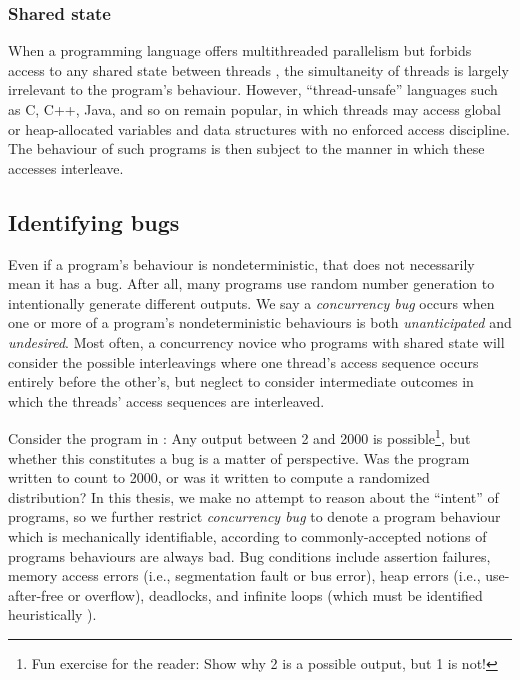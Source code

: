 \subsubsection{Shared state}
When a programming language offers multithreaded parallelism but forbids access to any shared state between threads
\cite{erlang,rust-book},
the simultaneity of threads is largely irrelevant to the program's behaviour.
However, ``thread-unsafe'' languages such as C, C++, Java, and so on remain popular,
in which threads may access global or heap-allocated variables and data structures with no enforced access discipline.
The behaviour of such programs is then subject to the manner in which these accesses interleave.

\subsection{Identifying bugs}

Even if a program's behaviour is nondeterministic, that does not necessarily mean it has a bug.
After all, many programs use random number generation to intentionally generate different outputs.
We say a {\em concurrency bug} occurs when one or more of a program's nondeterministic behaviours is both {\em unanticipated} and {\em undesired}.
Most often, a concurrency novice who programs with shared state will consider the possible interleavings where one thread's access sequence occurs entirely before the other's, but neglect to consider intermediate outcomes in which the threads' access sequences are interleaved.

Consider the program in : Any output between 2 and 2000 is possible\footnote{
	Fun exercise for the reader: Show why 2 is a possible output, but 1 is not!
},
but whether this constitutes a bug is a matter of perspective.
Was the program written to count to 2000, or was it written to compute a randomized distribution?
In this thesis, we make no attempt to reason about the ``intent'' of programs,
so we further restrict {\em concurrency bug} to denote a program behaviour which is mechanically identifiable,
according to commonly-accepted notions of  programs behaviours are always bad.
%
Bug conditions include assertion failures,
memory access errors (i.e., segmentation fault or bus error),
heap errors (i.e., use-after-free or overflow),
deadlocks,
and infinite loops (which must be identified heuristically \cite{entscheidungsproblem}).

